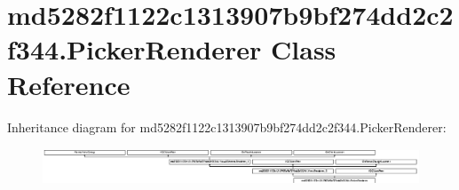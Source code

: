 \hypertarget{classmd5282f1122c1313907b9bf274dd2c2f344_1_1PickerRenderer}{}\section{md5282f1122c1313907b9bf274dd2c2f344.\+Picker\+Renderer Class Reference}
\label{classmd5282f1122c1313907b9bf274dd2c2f344_1_1PickerRenderer}
Inheritance diagram for md5282f1122c1313907b9bf274dd2c2f344.\+Picker\+Renderer\+:\begin{figure}[H]
\begin{center}
\leavevmode
\includegraphics[height=1.098039cm]{classmd5282f1122c1313907b9bf274dd2c2f344_1_1PickerRenderer}
\end{center}
\end{figure}
